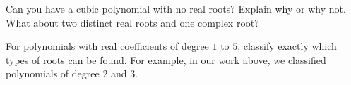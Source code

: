 \begin{prob}
Can you have a cubic polynomial with no real roots?  Explain why or
why not. What about two distinct real roots and one complex root?
\end{prob}


\begin{prob}
For polynomials with real coefficients of degree $1$ to $5$, classify
exactly which types of roots can be found. For example, in our work
above, we classified polynomials of degree $2$ and $3$.
\end{prob}
